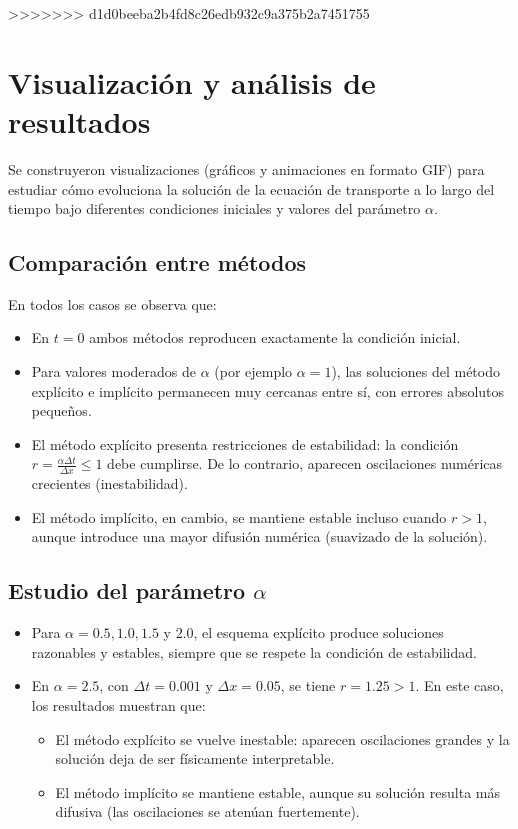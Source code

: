 \documentclass[12pt,a4paper]{article}
\begin{document}
>>>>>>> d1d0beeba2b4fd8c26edb932c9a375b2a7451755
\section{Visualización y análisis de resultados}

Se construyeron visualizaciones (gráficos y animaciones en formato GIF) para estudiar cómo evoluciona la solución de la ecuación de transporte a lo largo del tiempo bajo diferentes condiciones iniciales y valores del parámetro $\alpha$.

\subsection*{Comparación entre métodos}
En todos los casos se observa que:
\begin{itemize}
    \item En $t=0$ ambos métodos reproducen exactamente la condición inicial.
    \item Para valores moderados de $\alpha$ (por ejemplo $\alpha=1$), las soluciones del método explícito e implícito permanecen muy cercanas entre sí, con errores absolutos pequeños.
    \item El método explícito presenta restricciones de estabilidad: la condición $r = \frac{\alpha \Delta t}{\Delta x} \leq 1$ debe cumplirse. De lo contrario, aparecen oscilaciones numéricas crecientes (inestabilidad).
    \item El método implícito, en cambio, se mantiene estable incluso cuando $r>1$, aunque introduce una mayor difusión numérica (suavizado de la solución).
\end{itemize}

\subsection*{Estudio del parámetro $\alpha$}
\begin{itemize}
    \item Para $\alpha = 0.5, 1.0, 1.5$ y $2.0$, el esquema explícito produce soluciones razonables y estables, siempre que se respete la condición de estabilidad.
    \item En $\alpha=2.5$, con $\Delta t=0.001$ y $\Delta x=0.05$, se tiene $r=1.25>1$. En este caso, los resultados muestran que:
    \begin{itemize}
        \item El método explícito se vuelve inestable: aparecen oscilaciones grandes y la solución deja de ser físicamente interpretable.
        \item El método implícito se mantiene estable, aunque su solución resulta más difusiva (las oscilaciones se atenúan fuertemente).
    \end{itemize}
\end{itemize}
\end{document}
